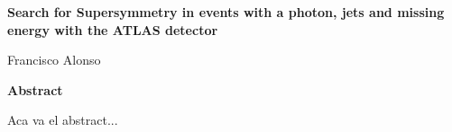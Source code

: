 \thispagestyle{plain}
\begin{center}
  \Large
  \textbf{Search for Supersymmetry in events with a photon, jets and
    missing energy with the ATLAS detector}

  \vspace{0.4cm}
  \large

  \vspace{0.4cm}
  Francisco Alonso

  \vspace{2cm}
  \textbf{Abstract}
\end{center}

Aca va el abstract...
